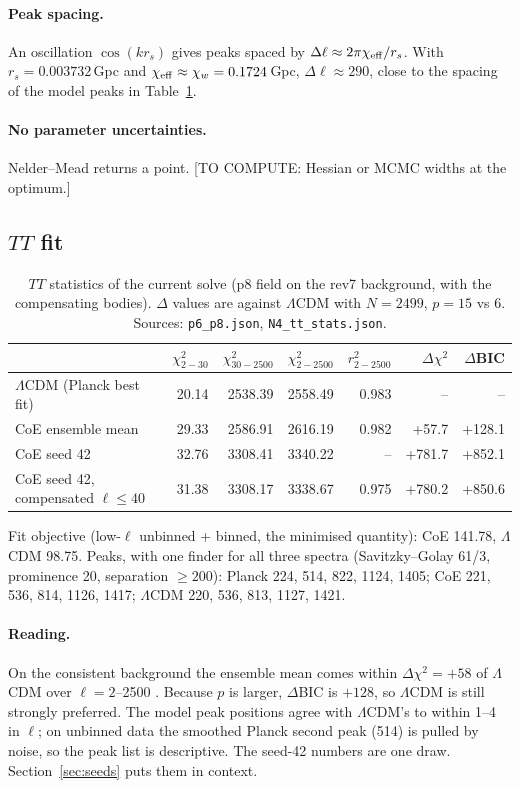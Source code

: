 \documentclass[11pt]{article}
\newcommand{\todo}[1]{\textsf{[#1]}}
\begin{document}
\paragraph{Peak spacing.} An oscillation $\cos(kr_s)$ gives peaks spaced by $\Delta\ell\approx2\pi\chi_{\rm eff}/r_s$. With $r_s=0.003732$\,Gpc and $\chi_{\rm eff}\approx\chi_w=0.1724$\,Gpc, $\Delta\ell\approx290$, close to the spacing of the model peaks in Table~\ref{tab:tt}.
\paragraph{No parameter uncertainties.} Nelder--Mead returns a point. \todo{TO COMPUTE: Hessian or MCMC widths at the optimum.}

\subsection{$TT$ fit}\label{sec:tt}
\begin{table}[!htb]\centering\small\caption{$TT$ statistics of the current solve (p8 field on the rev7 background, with the compensating bodies). $\Delta$ values are against $\Lambda$CDM with $N=2499$, $p=15$ vs 6. Sources: \texttt{p6\_p8.json}, \texttt{N4\_tt\_stats.json}.}\label{tab:tt}
\begin{tabular}{@{}lrrrrrr@{}}\toprule
 & $\chi^2_{2-30}$ & $\chi^2_{30-2500}$ & $\chi^2_{2-2500}$ & $r^2_{2-2500}$ & $\Delta\chi^2$ & $\Delta$BIC\\\midrule
$\Lambda$CDM (Planck best fit) & 20.14 & 2538.39 & 2558.49 & 0.983 & -- & --\\
CoE ensemble mean & 29.33 & 2586.91 & 2616.19 & 0.982 & +57.7 & +128.1\\
CoE seed 42 & 32.76 & 3308.41 & 3340.22 & -- & +781.7 & +852.1\\
CoE seed 42, compensated $\ell\le40$ & 31.38 & 3308.17 & 3338.67 & 0.975 & +780.2 & +850.6\\\bottomrule
\end{tabular}\end{table}

\noindent Fit objective (low-$\ell$ unbinned + binned, the minimised quantity): CoE 141.78, $\Lambda$CDM 98.75. Peaks, with one finder for all three spectra (Savitzky--Golay 61/3, prominence 20, separation $\ge200$): Planck 224, 514, 822, 1124, 1405; CoE 221, 536, 814, 1126, 1417; $\Lambda$CDM 220, 536, 813, 1127, 1421.

\paragraph{Reading.} On the consistent background the ensemble mean comes within $\Delta\chi^2=+58$ of $\Lambda$CDM over $\ell=2$--2500 . Because $p$ is larger, $\Delta$BIC is $+128$, so $\Lambda$CDM is still strongly preferred. The model peak positions agree with $\Lambda$CDM's to within 1--4 in $\ell$; on unbinned data the smoothed Planck second peak (514) is pulled by noise, so the peak list is descriptive. The seed-42 numbers are one draw. Section~\ref{sec:seeds} puts them in context.
\end{document}
